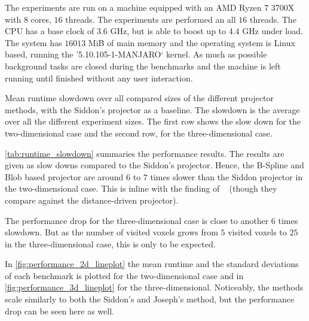 The experiments are run on a machine equipped with an AMD Ryzen 7 3700X with \(8\) cores, \(16\)
threads. The experiments are performed an all \(16\) threads. The CPU has a base clock of \(3.6\)
GHz, but is able to boost up to \(4.4\) GHz under load. The system has \(16013\) MiB of main memory
and the operating system is Linux based, running the '5.10.105-1-MANJARO` kernel. As much as
possible background tasks are closed during the benchmarks and the machine is left running until
finished without any user interaction.

\begin{table}[h]%
	\centering
	\caption{Mean runtime slowdown over all compared sizes of the different projector methods,
		with the Siddon's projector as a baseline. The slowdown is the average over all the
		different experiment sizes. The first row shows the slow down for the
		two-dimensional case and the second row, for the three-dimensional case.}%
	\label{tab:runtime_slowdown}
\end{table}

\autoref{tab:runtime_slowdown} summaries the performance results. The results are given as slow
downs compared to the Siddon's projector. Hence, the B-Spline and Blob based projector are around
\(6\) to \(7\) times slower than the Siddon projector in the two-dimensional case. This is inline
with the finding of \citeauthor*{momey_b-spline_2012}~\cite{momey_b-spline_2012} (though they
compare against the distance-driven projector).

The performance drop for the three-dimensional case is close to another \(6\) times slowdown. But as
the number of visited voxels grows from \(5\) visited voxels to \(25\) in the three-dimensional
case, this is only to be expected.

In \autoref{fig:performance_2d_lineplot} the mean runtime and the standard deviations of each
benchmark is plotted for the two-dimensional case and in \autoref{fig:performance_3d_lineplot} for
the three-dimensional. Noticeably, the methods scale similarly to both the Siddon's and Joseph's
method, but the performance drop can be seen here as well.

